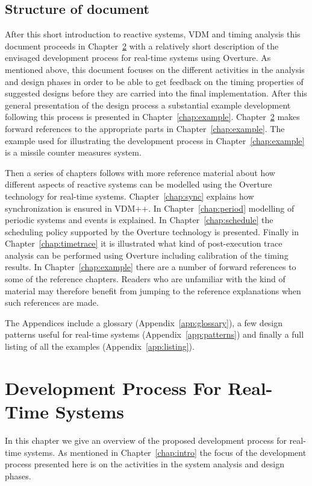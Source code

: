 \documentclass{overturerepchap}
\begin{document}
\section{Structure of document}

After this short introduction to reactive systems, VDM and timing
analysis this document proceeds in Chapter~\ref{chap:process} with a
relatively short description of the envisaged development process for
real-time systems using Overture. As mentioned above, this document
focuses on the different activities in the analysis and design phases
in order to be able to get feedback on the timing properties of
suggested designs before they are carried into the final
implementation. After this general presentation of the design process
a substantial example development following this process is presented
in Chapter~\ref{chap:example}. Chapter~\ref{chap:process} makes
forward references to the appropriate parts in
Chapter~\ref{chap:example}.  The example used for illustrating the
development process in Chapter~\ref{chap:example} is a missile counter
measures system.

Then a series of chapters follows with more reference material about
how different aspects of reactive systems can be modelled using the
Overture technology for real-time systems. Chapter~\ref{chap:sync}
explains how synchronization is ensured in VDM++.  In
Chapter~\ref{chap:period} modelling of periodic systems and events is
explained. In Chapter~\ref{chap:schedule} the
scheduling policy supported by the Overture technology is
presented. Finally in Chapter~\ref{chap:timetrace} it is illustrated
what kind of post-execution trace analysis can be performed using
Overture including calibration of the timing results. In
Chapter~\ref{chap:example} there are a number of forward references to
some of the reference chapters. Readers who are unfamiliar with the
kind of material may therefore benefit from jumping to the reference
explanations when such references are made.

The Appendices include a glossary (Appendix~\ref{app:glossary}), a few
design patterns useful for real-time systems
(Appendix~\ref{app:patterns}) and finally a full listing of all the
examples (Appendix~\ref{app:listing}).

\chapter{Development Process For Real-Time Systems}\label{chap:process}

In this chapter we give an overview of the proposed development
process for real-time systems. As mentioned in
Chapter~\ref{chap:intro} the focus of the development process
presented here is on the activities in the system analysis and design phases.
\end{document}
